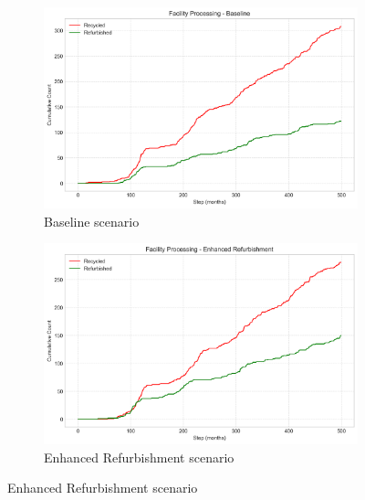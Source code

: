 \begin{figure}[htbp]
\centering
\begin{subfigure}{0.42\textwidth}
    \includegraphics[width=\textwidth]{figures/baseline_facility_processing.png}
    \caption{Baseline scenario}
    \label{fig:facility_baseline}
\end{subfigure}
\hfill
\begin{subfigure}{0.42\textwidth}
    \includegraphics[width=\textwidth]{figures/enhanced_refurbishment_facility_processing.png}
    \caption{Enhanced Refurbishment scenario}
    \label{fig:facility_enhanced}
\end{subfigure}


\end{figure}
